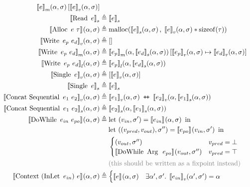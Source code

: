 \begin{align*}
  \denotefsub{m}{e}{\targ,\tmem}[\denotefv{e}{\targ,\tmem}]\\
%
\denotestate{\uop{Read}{e}} &\eqdef \denotestate{e}\\
%
\denotef{\bop{Alloc}{e}{\tau}}{\targ,\tmem} &\eqdef \operatorname{malloc}(\denotefs{e}{\targ,\tmem},\; \denotefv{e}{\targ,\tmem} * \operatorname{sizeof}(\tau))\\
%
\denotefv{\bop{Write}{e_p}{e_d}}{\targ,\tmem} &\eqdef []\\
%
\denotefsub{m}{\bop{Write}{e_p}{e_d}}{\targ,\tmem} &\eqdef
\denotefsub{m}{e_p}{\targ,\denotefs{e_d}{\targ,\tmem}}[\denotefv{e_p}{\targ,\tmem} \mapsto \denotefv{e_d}{\targ,\tmem}]\\
%
\denotefsub{l}{\bop{Write}{e_p}{e_d}}{\targ,\tmem} &\eqdef
\denotefsub{l}{e_p}{\targ,\denotefs{e_d}{\targ,\tmem}}\\
%
\denotefv{\uop{Single}e}{\targ,\tmem} &\eqdef [\denotefv{e}{\targ,\tmem}]\\
\denotestate{\uop{Single}e} &\eqdef \denotestate{e} \\
%
\denotefv{\bop{Concat\ Sequential}{e_1}{e_2}}{\targ,\tmem} &\eqdef
\append{\denotefv{e_1}{\targ,\tmem}}{\denotefv{e_2}{\targ,\denotefs{e_1}{\targ,\tmem}}}\\
%
\denotefs{\bop{Concat\ Sequential}{e_1}{e_2}}{\targ,\tmem} &\eqdef
\denotefs{e_2}{\targ,\denotefs{e_1}{\targ,\tmem}}\\
%
\denotef{\bop{DoWhile}{e_{in}}{e_{po}}}{\targ,\tmem} &\eqdef
\mathrm{let}\ (v_{in},\tmem') = \denotef{e_{in}}{\targ,\tmem}\ \mathrm{in}\\
&\hspace{1.3em}\mathrm{let}\ ((v_{pred}, v_{out}), \tmem'') = \denotef{e_{po}}{v_{in},\tmem'}\ \mathrm{in}\\
&\hspace{1.3em}\begin{cases}
   (v_{out}, \tmem'')
   & v_{pred} = \bot\\
   \denotef{\bop{DoWhile}{\mathrm{Arg}\ }{e_{po}}}{v_{out},\tmem''}
   & v_{pred} = \top\\
\end{cases}\\
&\hspace{1.3em}\text{\color{gray}(this should be written as a fixpoint instead)}\\
\denotef{\bop{Context}{(\uop{InLet}{e_{in}})}{e}}{\targ,\tmem} &\eqdef
\begin{cases}
  \denotef{e}{\targ,\tmem} & \exists \targ', \tmem' . \; \denotefv{e_{in}}{\targ',\tmem'} = \targ

\end{cases}
\end{align*}
